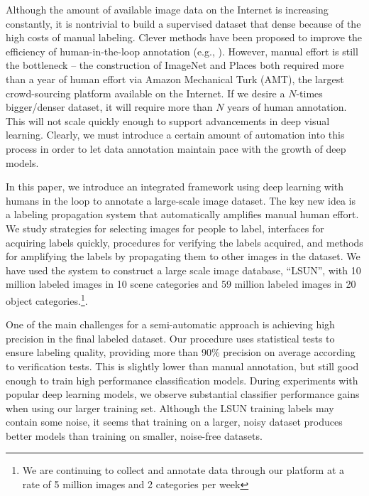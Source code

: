 Although the amount of available image data on the Internet is
increasing constantly, it is nontrivial to build a supervised dataset that
dense because of the high costs of manual labeling.  Clever methods
have been proposed to improve the efficiency of human-in-the-loop
annotation (e.g., \cite{branson2010visual,deng2014scalable,russakovsky2015best,vijayanarasimhan2008multi,wah2011multclass}).
However, manual effort is still the bottleneck -- the
construction of ImageNet and Places both required more than a year of
human effort via Amazon Mechanical Turk (AMT), the largest
crowd-sourcing platform available on the Internet. If we desire a
$N$-times bigger/denser dataset, it will require more than $N$ years of
human annotation. This will not scale quickly enough to support
advancements in deep visual learning. Clearly, we must
introduce a certain amount of automation into this process in order to
let data annotation maintain pace with the growth of deep models.


In this paper, we introduce an integrated framework using deep
learning with humans in the loop
to annotate a large-scale image dataset. The key new idea is a labeling propagation
system that automatically amplifies manual human effort.  We study strategies for
selecting images for people to label, interfaces for acquiring labels quickly,
procedures for verifying the labels acquired, and methods for amplifying the labels by
propagating them to other images in the dataset.  We have used the system to
construct a large scale image database, ``LSUN'', with 10 million labeled images
in 10 scene categories and 59 million labeled images in 20 object categories.\footnote{We are continuing to collect and
annotate data through our platform at a rate of 5 million images and 2 categories
per week}.

One of the main challenges for a semi-automatic approach
is achieving high precision in the final labeled dataset.  
Our procedure uses statistical tests to ensure labeling quality,
providing more than 90\% precision on average according to
verification tests.  This is slightly lower than manual annotation,
but still good enough to train
high performance classification models.  During experiments with
popular deep learning models, we observe
substantial classifier performance gains when using our larger training
set.  Although the LSUN training labels may contain some noise, it
seems that training on a larger, noisy dataset 
produces better models than training on smaller, noise-free datasets.




